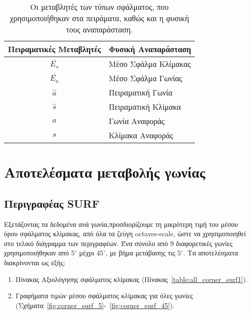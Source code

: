 \begin{table}[htbp]
\centering
\begin{tabular}{|c|l|}
\hline
\textbf{Πειραματικές Μεταβλητές} & \textbf{Φυσική Αναπαράσταση}\\ \hline
$\bar{E_s}$ & Mέσο Σφάλμα Κλίμακας\\ 
$\bar{E_a}$ & Μέσο Σφάλμα Γωνίας \\
$\hat{a}$ & Πειραματική Γωνία\\
$\hat{s}$ & Πειραματική Κλίμακα\\
$a$ & Γωνία Αναφοράς\\ 
$s$ & Κλίμακα Αναφοράς\\ \cline{1-2}
    
 \end{tabular}
\caption{Οι μεταβλητές των τύπων σφάλματος, που χρησιμοποιήθηκαν στα πειράματα, καθώς και η φυσική τους αναπαράσταση.}
\label{table:functions}

\end{table}
 
 
\newpage

 \section{Αποτελέσματα μεταβολής γωνίας}
 
 
  \subsection{Περιγραφέας SURF}
  
 Εξετάζοντας τα δεδομένα ανά γωνία,προσδιορίζουμε τη μικρότερη τιμή του μέσου όρου σφάλματος κλίμακας, από όλα τα ζεύγη 
octaves-scale, ώστε να χρησιμοποιηθεί στο τελικό διάγραμμα των περιγραφέων.
 Ένα σύνολο από 9 διαφορετικές γωνίες χρησιμοποιήθηκαν από  $5^{\circ}$ μέχρι $45^{\circ}$, με βήμα μετάβασης τις  $5^{\circ}$. Τα αποτελέσματα διακρίνονται ως εξής:
 
 \begin{enumerate}
 
 \item Πίνακας Αξιολόγησης σφάλματος κλίμακας (Πίνακας~\ref{table:all_corner_surf1}).
 \item Γραφήματα τιμών μέσου σφάλματος κλίμακας για όλες γωνίες (Σχήματα~\ref{fig:corner_surf_5}-~\ref{fig:corner_surf_45}).
 
\end{enumerate}


